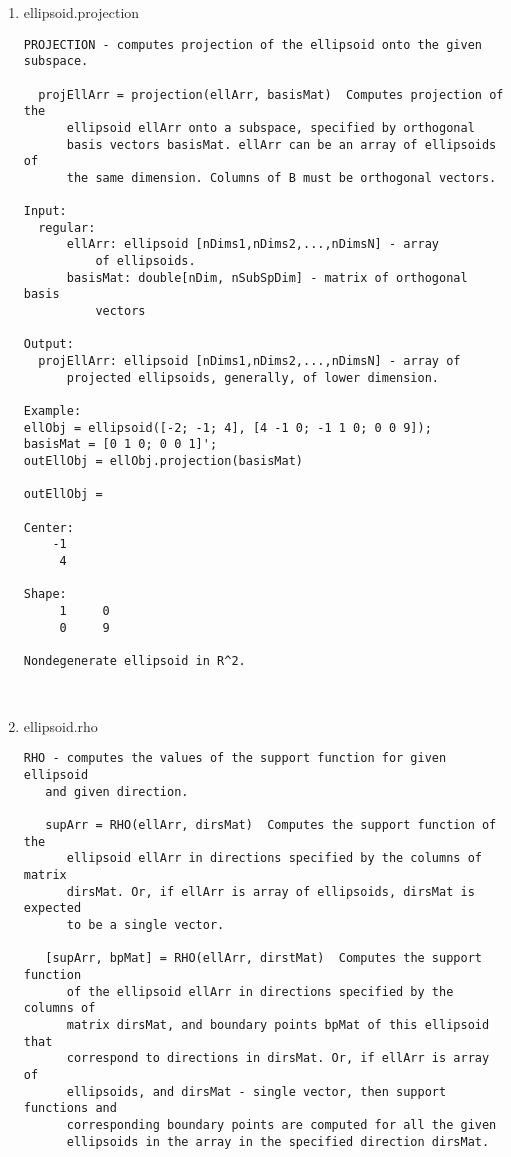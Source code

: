 \begin{enumerate}
\begin{lstlisting}
\end{lstlisting}
\fontfamily{\familydefault}
\selectfont
\item {ellipsoid.projection}
\selectfont
\begin{lstlisting}
PROJECTION - computes projection of the ellipsoid onto the given subspace.

  projEllArr = projection(ellArr, basisMat)  Computes projection of the
      ellipsoid ellArr onto a subspace, specified by orthogonal
      basis vectors basisMat. ellArr can be an array of ellipsoids of
      the same dimension. Columns of B must be orthogonal vectors.

Input:
  regular:
      ellArr: ellipsoid [nDims1,nDims2,...,nDimsN] - array
          of ellipsoids.
      basisMat: double[nDim, nSubSpDim] - matrix of orthogonal basis
          vectors

Output:
  projEllArr: ellipsoid [nDims1,nDims2,...,nDimsN] - array of
      projected ellipsoids, generally, of lower dimension.

Example:
ellObj = ellipsoid([-2; -1; 4], [4 -1 0; -1 1 0; 0 0 9]);
basisMat = [0 1 0; 0 0 1]';
outEllObj = ellObj.projection(basisMat)

outEllObj =

Center:
    -1
     4

Shape:
     1     0
     0     9

Nondegenerate ellipsoid in R^2.



\end{lstlisting}
\fontfamily{\familydefault}
\selectfont
\item {ellipsoid.rho}
\selectfont
\begin{lstlisting}
RHO - computes the values of the support function for given ellipsoid
   and given direction.

   supArr = RHO(ellArr, dirsMat)  Computes the support function of the
      ellipsoid ellArr in directions specified by the columns of matrix
      dirsMat. Or, if ellArr is array of ellipsoids, dirsMat is expected
      to be a single vector.

   [supArr, bpMat] = RHO(ellArr, dirstMat)  Computes the support function
      of the ellipsoid ellArr in directions specified by the columns of
      matrix dirsMat, and boundary points bpMat of this ellipsoid that
      correspond to directions in dirsMat. Or, if ellArr is array of
      ellipsoids, and dirsMat - single vector, then support functions and
      corresponding boundary points are computed for all the given
      ellipsoids in the array in the specified direction dirsMat.


\end{lstlisting}
\end{enumerate}

